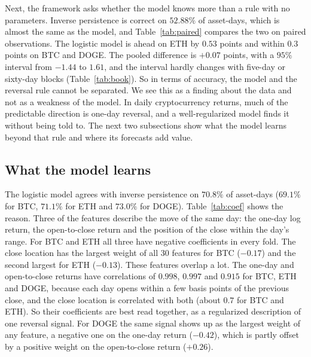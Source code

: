 \documentclass[preprint,12pt,authoryear,a4paper]{elsarticle}
\begin{document}
Next, the framework asks whether the model knows more than a rule with no
parameters. Inverse persistence is correct on $52.88\%$ of asset-days, which is
almost the same as the model, and Table~\ref{tab:paired} compares the two on paired
observations. The logistic model is ahead on ETH by $0.53$ points and within $0.3$
points on BTC and DOGE. The pooled difference is $+0.07$ points, with a $95\%$
interval from $-1.44$ to $1.61$, and the interval hardly changes with five-day or
sixty-day blocks (Table~\ref{tab:book}). So in terms of accuracy, the model and the
reversal rule cannot be separated. We see this as a finding about the data and not
as a weakness of the model. In daily cryptocurrency returns, much of the predictable
direction is one-day reversal, and a well-regularized model finds it without being
told to. The next two subsections show what the model learns beyond that rule and
where its forecasts add value.

\subsection{What the model learns}\label{ssec:learned}

The logistic model agrees with inverse persistence on $70.8\%$ of asset-days
($69.1\%$ for BTC, $71.1\%$ for ETH and $73.0\%$ for DOGE). Table~\ref{tab:coef}
shows the reason. Three of the features describe the move of the same day: the
one-day log return, the open-to-close return and the position of the close within
the day's range. For BTC and ETH all three have negative coefficients in every fold.
The close location has the largest weight of all 30 features for BTC ($-0.17$) and
the second largest for ETH ($-0.13$). These features overlap a lot. The one-day and
open-to-close returns have correlations of $0.998$, $0.997$ and $0.915$ for BTC,
ETH and DOGE, because each day opens within a few basis points of the previous
close, and the close location is correlated with both (about $0.7$ for BTC and
ETH). So their coefficients are best read together, as a regularized description
of one reversal signal. For DOGE the same signal shows up as the largest weight of
any feature, a negative one on the one-day return ($-0.42$), which is partly offset
by a positive weight on the open-to-close return ($+0.26$).
\end{document}
